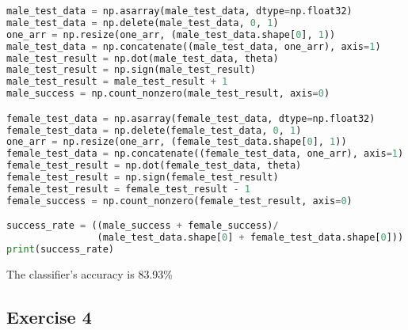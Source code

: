 \documentclass[11pt]{article}
\begin{document}
\begin{enumerate}[label=(\alph*)]
\begin{lstlisting}[language=Python, showstringspaces=false]
male_test_data = np.asarray(male_test_data, dtype=np.float32)
male_test_data = np.delete(male_test_data, 0, 1)
one_arr = np.resize(one_arr, (male_test_data.shape[0], 1))
male_test_data = np.concatenate((male_test_data, one_arr), axis=1)
male_test_result = np.dot(male_test_data, theta)
male_test_result = np.sign(male_test_result)
male_test_result = male_test_result + 1 
male_success = np.count_nonzero(male_test_result, axis=0)

female_test_data = np.asarray(female_test_data, dtype=np.float32)
female_test_data = np.delete(female_test_data, 0, 1)
one_arr = np.resize(one_arr, (female_test_data.shape[0], 1))
female_test_data = np.concatenate((female_test_data, one_arr), axis=1)
female_test_result = np.dot(female_test_data, theta)
female_test_result = np.sign(female_test_result)
female_test_result = female_test_result - 1
female_success = np.count_nonzero(female_test_result, axis=0)

success_rate = ((male_success + female_success)/
                (male_test_data.shape[0] + female_test_data.shape[0]))
print(success_rate)
\end{lstlisting}

The classifier’s accuracy is 83.93\%

\end{enumerate}

\newpage

\subsection*{Exercise 4}
\end{document}
